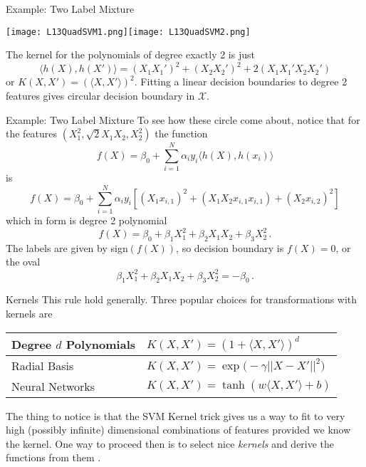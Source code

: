 \documentclass[10pt, table, dvipsnames,xcdraw]{beamer}
\begin{document}
\begin{frame}[fragile]{Example: Two Label Mixture}
  \begin{minipage}[t][0.6\textheight][t]{\textwidth}
	\centering \texttt{[image: L13QuadSVM1.png]}\texttt{[image: L13QuadSVM2.png]}
  \end{minipage}
  \vfill
\begin{minipage}[t][0.4\textheight][t]{\textwidth}
The kernel for the polynomials of degree exactly 2 is just 
$$
\langle h(X),h(X')\rangle = (X_1X_1')^2 + (X_2X_2')^2 + 2(X_1X_1'X_2X_2') 
$$
or $K(X,X') = (\langle X,X'\rangle)^2$. Fitting a linear decision boundaries to degree 2 features gives circular decision boundary in $\mathcal{X}$. 
\end{minipage}
\end{frame}







\begin{frame}[fragile]{Example: Two Label Mixture}
To see how these circle come about, notice that for the features $(X_1^2, \sqrt{2}X_1X_2, X_2^2)$ the function
$$
f(X) =  \beta_0+\sum_{i=1}^N\alpha_iy_i \langle h(X),h(x_i)\rangle 
$$
is
$$
f(X) = \beta_0+ \sum_{i=1}^N\alpha_iy_i [(X_1x_{i,1})^2 +(X_1X_2x_{i,1}x_{i,1}) +(X_2x_{i,2})^2]
$$\pause
which in form is degree 2 polynomial
$$
f(X) = \beta_0+ \beta_1 X_1^2 + \beta_2X_1X_2 + \beta_3X_2^2\,.
$$\pause
The labels are given by sign$(f(X))$, so decision boundary is $f(X) =0$, or the oval
$$
\beta_1 X_1^2 + \beta_2X_1X_2 + \beta_3X_2^2 = -\beta_0\,.
$$
\end{frame}





\begin{frame}[fragile]{Kernels}
This rule hold generally. Three popular choices for transformations with kernels are
\begin{table}[]
\begin{tabular}{ll}
\hline
Degree $d$ Polynomials               & $K(X,X') = (1+\langle X,X'\rangle)^d$                                                  
 \\ \hline
Radial Basis &  $K(X,X') = \exp\big(-\gamma||X-X'||^2\big)$                      
\\ \hline
Neural Networks                    & $K(X,X') =\tanh(w\langle X,X'\rangle + b)$ \\ \hline
\end{tabular}
\end{table}\pause
The thing to notice is that the SVM Kernel trick gives us a way to fit to very high (possibly infinite) dimensional combinations of features provided we know the kernel. One way to proceed then is to select nice \emph{kernels} and derive the functions from them . 
\end{frame}
\end{document}
